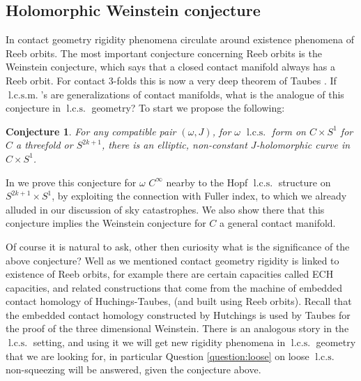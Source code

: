 \documentclass{amsart}
\numberwithin{equation}{section}
\newtheorem{conjecture}{Conjecture}
\theoremstyle{definition}
\theoremstyle{remark}
\DeclareMathOperator{\lcs}{l.c.s.}
\DeclareMathOperator{\lcsm}{l.c.s.m.}
\begin{document}
\subsection {Holomorphic Weinstein conjecture} In contact geometry rigidity phenomena circulate around existence phenomena of Reeb orbits. The most important conjecture concerning Reeb orbits is the Weinstein conjecture, which says that a closed contact manifold always has a Reeb orbit. For contact 3-folds this is now a very deep theorem of Taubes \cite{citeTaubesWeinsteinconjecture}.
If $\lcsm$'s are generalizations of contact manifolds, what is the analogue of this conjecture in $\lcs$ geometry?
To start we propose the following:
\begin{conjecture} \label{conj:Hol} For any compatible pair  $(\omega, J)$, for $\omega$ $\lcs$ form on $C \times S ^{1}  $ for $C$ a threefold or $S ^{2k+1} $, there is an elliptic, non-constant $J$-holomorphic curve in $C \times S ^{1}  $.
\end{conjecture}
In \cite{citeSavelyevConformalSymplectic} we prove this conjecture for $\omega$ $C ^{\infty} $ nearby to the Hopf $\lcs$ structure on $S ^{2k+1} \times S ^{1}  $, by exploiting the connection with Fuller index, to which we already alluded in our discussion of sky catastrophes.
We also show there that this conjecture implies the Weinstein conjecture for $C$ a general contact manifold.


Of course it is natural to ask, other then curiosity what is the significance of the above conjecture? Well as we mentioned contact geometry rigidity is linked to existence of Reeb orbits, for example there are certain capacities called ECH capacities, and related constructions \cite{citeHutchingsBeyond} that come from the machine of embedded contact homology of Huchings-Taubes, (and built using Reeb orbits). Recall that the embedded contact homology 
constructed by Hutchings is used by Taubes for the proof of the three dimensional Weinstein.
There is an analogous story in the $\lcs$ setting, and using it we will get new rigidity phenomena in $\lcs$ geometry that we are looking for, in particular Question \ref{question:loose} on loose $\lcs$ non-squeezing will be answered, given the conjecture above.
\end{document}
